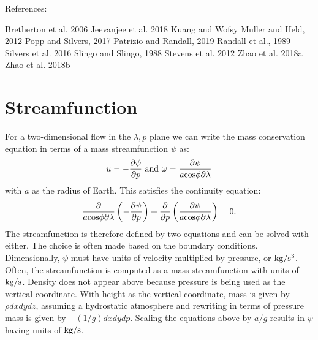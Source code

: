 \documentclass[11pt]{article}   	%
\begin{document}
References: 

Bretherton et al. 2006
Jeevanjee et al. 2018
Kuang and Wofsy
Muller and Held, 2012
Popp and Silvers, 2017
Patrizio and Randall, 2019
Randall et al., 1989
Silvers et al. 2016
Slingo and Slingo, 1988
Stevens et al. 2012
Zhao et al. 2018a
Zhao et al. 2018b





\appendix


\section{Streamfunction}

For a two-dimensional flow in the $\lambda,p$ plane we can write the mass conservation equation in terms of a 
mass streamfunction $\psi$ as: 
\begin{equation}
u =  -\frac{\partial \psi}{\partial p}   \,\, {\rm and} \,\, \omega =\frac{\partial \psi}{a \rm{cos} \phi \partial \lambda}
\end{equation}
with $a$ as the radius of Earth.
This satisfies the continuity equation: 
\begin{equation}
\frac{\partial}{a \rm{cos} \phi\partial\lambda}\left(-\frac{\partial \psi}{\partial p}\right)+\frac{\partial}{\partial p}\left(\frac{\partial \psi}{a \rm{cos}\phi \partial \lambda}\right)=0.
\end{equation}
The streamfunction is therefore defined by two equations and can be solved with either.  The choice is often made based on the 
boundary conditions.  Dimensionally, $\psi$ must have units of velocity multiplied by pressure, or $\rm{kg/s^3}$.  Often, the streamfunction
is computed as a mass streamfunction with units of $\rm{kg/s}$.  Density does not appear above
because pressure is being used as the vertical coordinate.   With height as the vertical coordinate, mass is given by $\rho dxdydz$, 
assuming a hydrostatic atmosphere and rewriting in terms of pressure mass is given by $-(1/g) dxdydp$.
Scaling the equations above by $a/g$ results in $\psi$ having units of $\rm{kg/s}$.  
\end{document}
